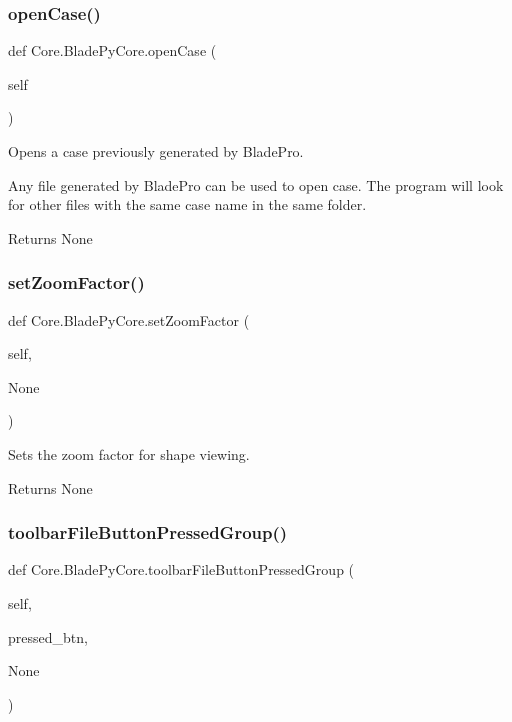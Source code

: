 \subsubsection{\texorpdfstring{open\+Case()}{openCase()}}
{\footnotesize\ttfamily def Core.\+Blade\+Py\+Core.\+open\+Case (\begin{DoxyParamCaption}\item[{}]{self }\end{DoxyParamCaption})}



Opens a case previously generated by Blade\+Pro. 

Any file generated by Blade\+Pro can be used to open case. The program will look for other files with the same case name in the same folder.

\begin{DoxyReturn}{Returns}
None 
\end{DoxyReturn}
\hypertarget{a00078_a2c818d907d8c5797873e1a7ad54c7d13}{}\label{a00078_a2c818d907d8c5797873e1a7ad54c7d13} 
\subsubsection{\texorpdfstring{set\+Zoom\+Factor()}{setZoomFactor()}}
{\footnotesize\ttfamily def Core.\+Blade\+Py\+Core.\+set\+Zoom\+Factor (\begin{DoxyParamCaption}\item[{}]{self,  }\item[{}]{None }\end{DoxyParamCaption})}



Sets the zoom factor for shape viewing. 

\begin{DoxyReturn}{Returns}
None 
\end{DoxyReturn}
\hypertarget{a00078_ab5cf733dc40f2b17761056148fd51263}{}\label{a00078_ab5cf733dc40f2b17761056148fd51263} 
\subsubsection{\texorpdfstring{toolbar\+File\+Button\+Pressed\+Group()}{toolbarFileButtonPressedGroup()}}
{\footnotesize\ttfamily def Core.\+Blade\+Py\+Core.\+toolbar\+File\+Button\+Pressed\+Group (\begin{DoxyParamCaption}\item[{}]{self,  }\item[{}]{pressed\+\_\+btn,  }\item[{}]{None }\end{DoxyParamCaption})}




